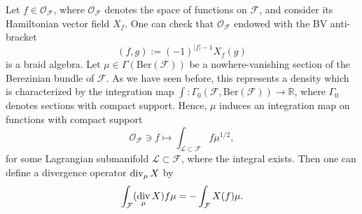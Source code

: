 \documentclass[11pt,colorinlistoftodos]{amsart}
\numberwithin{equation}{subsection}
\theoremstyle{plain}
\theoremstyle{definition}
\theoremstyle{remark}
\newcommand{\R}{\mathbb{R}}
\DeclareMathOperator{\Div}{\textnormal{div}}
\newcommand{\calO}{\mathcal{O}}
\newcommand{\calL}{\mathcal{L}}
\newcommand{\calF}{\mathcal{F}}
\begin{document}
Let $f\in \calO_\calF$, where $\calO_\calF$ denotes the space of functions on $\calF$, and consider its Hamiltonian vector field $X_f$. One can check that $\calO_\calF$ endowed with the BV anti-bracket
\begin{equation}
\label{eq:odd_Poisson_bracket}
    (f,g):=(-1)^{\vert f\vert -1}X_f(g)
\end{equation}
is a braid algebra. Let $\mu\in \Gamma(\mathrm{Ber}(\calF))$ be a nowhere-vanishing section of the Berezinian bundle of $\calF$. As we have seen before, this represents a density which is characterized by the integration map $\int\colon \Gamma_0(\calF,\mathrm{Ber}(\calF))\to \R$, where $\Gamma_0$ denotes sections with compact support. Hence, $\mu$ induces an integration map on functions with compact support
\begin{equation}
    \calO_\calF\ni f\mapsto \int_{\calL\subset\calF} f\mu^{1/2},
\end{equation}
for some Lagrangian submanifold $\calL\subset \calF$, where the integral exists.
Then one can define a divergence operator $\Div_\mu X$ by 
\begin{equation}
    \int_\calF (\Div_\mu X)f\mu=-\int_\calF X(f)\mu.
\end{equation}
\end{document}
